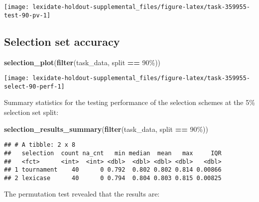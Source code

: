 \documentclass[
]{book}
\newenvironment{Shaded}{\begin{snugshade}}{\end{snugshade}}
\newcommand{\FunctionTok}[1]{\textcolor[rgb]{0.13,0.29,0.53}{\textbf{#1}}}
\newcommand{\NormalTok}[1]{#1}
\newcommand{\SpecialCharTok}[1]{\textcolor[rgb]{0.81,0.36,0.00}{\textbf{#1}}}
\newcommand{\StringTok}[1]{\textcolor[rgb]{0.31,0.60,0.02}{#1}}
\begin{document}
\texttt{[image: lexidate-holdout-supplemental\_files/figure-latex/task-359955-test-90-pv-1]}

\hypertarget{selection-set-accuracy-13}{%
\subsection{Selection set accuracy}\label{selection-set-accuracy-13}}

\begin{Shaded}
\begin{Highlighting}[]
\FunctionTok{selection\_plot}\NormalTok{(}\FunctionTok{filter}\NormalTok{(task\_data, split }\SpecialCharTok{==} \StringTok{\textquotesingle{}90\%\textquotesingle{}}\NormalTok{))}
\end{Highlighting}
\end{Shaded}

\texttt{[image: lexidate-holdout-supplemental\_files/figure-latex/task-359955-select-90-perf-1]}

Summary statistics for the testing performance of the selection schemes at the 5\% selection set split:

\begin{Shaded}
\begin{Highlighting}[]
\FunctionTok{selection\_results\_summary}\NormalTok{(}\FunctionTok{filter}\NormalTok{(task\_data, split }\SpecialCharTok{==} \StringTok{\textquotesingle{}90\%\textquotesingle{}}\NormalTok{))}
\end{Highlighting}
\end{Shaded}

\begin{verbatim}
## # A tibble: 2 x 8
##   selection  count na_cnt   min median  mean   max     IQR
##   <fct>      <int>  <int> <dbl>  <dbl> <dbl> <dbl>   <dbl>
## 1 tournament    40      0 0.792  0.802 0.802 0.814 0.00866
## 2 lexicase      40      0 0.794  0.804 0.803 0.815 0.00825
\end{verbatim}

The permutation test revealed that the results are:
\end{document}
